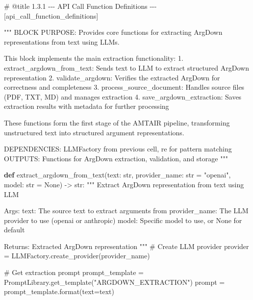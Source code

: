 \documentclass[
  11pt,
  letterpaper,
]{book}
\newenvironment{Shaded}{\begin{snugshade}}{\end{snugshade}}
\newcommand{\BuiltInTok}[1]{\textcolor[rgb]{0.00,0.23,0.31}{#1}}
\newcommand{\CommentTok}[1]{\textcolor[rgb]{0.37,0.37,0.37}{#1}}
\newcommand{\KeywordTok}[1]{\textcolor[rgb]{0.00,0.23,0.31}{\textbf{#1}}}
\newcommand{\NormalTok}[1]{\textcolor[rgb]{0.00,0.23,0.31}{#1}}
\newcommand{\OperatorTok}[1]{\textcolor[rgb]{0.37,0.37,0.37}{#1}}
\newcommand{\StringTok}[1]{\textcolor[rgb]{0.13,0.47,0.30}{#1}}
\newcommand{\VariableTok}[1]{\textcolor[rgb]{0.07,0.07,0.07}{#1}}
\begin{document}
\label{api_call_function_definitions}
\begin{Shaded}
\begin{Highlighting}[]
\CommentTok{\# @title 1.3.1 {-}{-}{-} API Call Function Definitions {-}{-}{-} [api\_call\_function\_definitions]}

\CommentTok{"""}
\CommentTok{BLOCK PURPOSE: Provides core functions for extracting ArgDown representations from text using LLMs.}

\CommentTok{This block implements the main extraction functionality:}
\CommentTok{1. extract\_argdown\_from\_text: Sends text to LLM to extract structured ArgDown representation}
\CommentTok{2. validate\_argdown: Verifies the extracted ArgDown for correctness and completeness}
\CommentTok{3. process\_source\_document: Handles source files (PDF, TXT, MD) and manages extraction}
\CommentTok{4. save\_argdown\_extraction: Saves extraction results with metadata for further processing}

\CommentTok{These functions form the first stage of the AMTAIR pipeline, transforming}
\CommentTok{unstructured text into structured argument representations.}

\CommentTok{DEPENDENCIES: LLMFactory from previous cell, re for pattern matching}
\CommentTok{OUTPUTS: Functions for ArgDown extraction, validation, and storage}
\CommentTok{"""}

\KeywordTok{def}\NormalTok{ extract\_argdown\_from\_text(text: }\BuiltInTok{str}\NormalTok{, provider\_name: }\BuiltInTok{str} \OperatorTok{=} \StringTok{"openai"}\NormalTok{, model: }\BuiltInTok{str} \OperatorTok{=} \VariableTok{None}\NormalTok{) }\OperatorTok{{-}\textgreater{}} \BuiltInTok{str}\NormalTok{:}
    \CommentTok{"""}
\CommentTok{    Extract ArgDown representation from text using LLM}

\CommentTok{    Args:}
\CommentTok{        text: The source text to extract arguments from}
\CommentTok{        provider\_name: The LLM provider to use (openai or anthropic)}
\CommentTok{        model: Specific model to use, or None for default}

\CommentTok{    Returns:}
\CommentTok{        Extracted ArgDown representation}
\CommentTok{    """}
    \CommentTok{\# Create LLM provider}
\NormalTok{    provider }\OperatorTok{=}\NormalTok{ LLMFactory.create\_provider(provider\_name)}

    \CommentTok{\# Get extraction prompt}
\NormalTok{    prompt\_template }\OperatorTok{=}\NormalTok{ PromptLibrary.get\_template(}\StringTok{"ARGDOWN\_EXTRACTION"}\NormalTok{)}
\NormalTok{    prompt }\OperatorTok{=}\NormalTok{ prompt\_template.}\BuiltInTok{format}\NormalTok{(text}\OperatorTok{=}\NormalTok{text)}


\end{Highlighting}
\end{Shaded}
\end{document}
